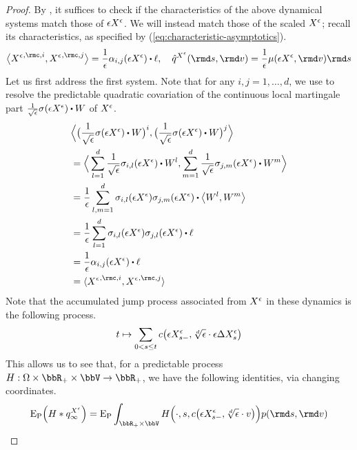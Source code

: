\begin{proof}
  \label{proof:proposition:sde-asymptotics}
  By \cite[III.2.26]{jacod2003}, it suffices to check if the characteristics of the above dynamical systems match those of $\epsilon X^\epsilon$.
  We will instead match those of the scaled $X^\epsilon$; recall its characteristics, as specified by (\ref{eq:characteristic-asymptotics}).
  \begin{equation*}
    \bprj{{\Xee}^{,\rmc,i}}{{\Xee}^{,\rmc,j}} = \frac1\epsilon\affDiff_{i,j}(\Xe) \shortInt \leb, \quad
    \predproj{\jumpMeas^{\Xee}}(\rmd s, \rmd\markVar) = \frac1\epsilon \affJump(\Xe, \rmd\markVar) \rmd s
  \end{equation*}
  Let us first address the first system.
  Note that for any $i, j = 1, \ldots, d$, we use \cite[Theorem I.4.40(d)]{jacod2003} to resolve the predictable quadratic covariation of the continuous local martingale part $\frac{1}{\sqrt\epsilon} \affDiffSqrt(\Xe) \shortInt \W$ of $X^\epsilon$.
  \begin{align*}
    &\Bprj{\big(\frac{1}{\sqrt\epsilon} \affDiffSqrt(\Xe) \shortInt\W\big)^i}{\big(\frac{1}{\sqrt\epsilon} \affDiffSqrt(\Xe) \shortInt\W\big)^j} \\
    &= \Bprj{\sum_{l=1}^d \frac{1}{\sqrt\epsilon} \affDiffSqrt_{i,l}(\Xe) \shortInt\W^l}{\sum_{m=1}^d \frac{1}{\sqrt\epsilon} \affDiffSqrt_{j,m}(\Xe) \shortInt\W^m} \\
    &= \frac1\epsilon\sum_{l,m=1}^d \affDiffSqrt_{i,l}(\Xe)\affDiffSqrt_{j,m}(\Xe) \shortInt \bprj{\W^l}{\W^m} \\
    &= \frac1\epsilon\sum_{l=1}^d \affDiffSqrt_{i,l}(\Xe)\affDiffSqrt_{j,l}(\Xe) \shortInt \leb \\
    &= \frac1\epsilon \affDiff_{i,j}(\Xe) \shortInt \leb \\
    &= \prj{{\Xee}^{,\rmc,i}}{{\Xee}^{,\rmc,j}}
  \end{align*}
  Note that the accumulated jump process associated from $X^\epsilon$ in these dynamics is the following process.
  \begin{equation*}
    t \mapsto \sum_{0<s\leq t} c\big(\epsilon X^\epsilon_{s-}, \sqrt[d]{\epsilon} \cdot \epsilon\Delta X^\epsilon_s \big) 
  \end{equation*}
  This allows us to see that, for a predictable process $H: \Omega \times \bbR_+ \times \vecSpace \rightarrow \bbR_+$, we have the following identities, via changing coordinates.
  \begin{align*}
    \Exp_\Prb\Big( H \ast \jumpMeas^{\Xee}_\infty \Big)
    &= \Exp_\Prb \int_{\bbR_+\times\vecSpace} H\Big(\cdot, s, \thinner\big(\Xe_{s-}, \sqrt[d]{\epsilon} \cdot \markVar\big) \Big) \poisRM(\rmd s, \rmd\markVar) \\

\end{align*}
\end{proof}
